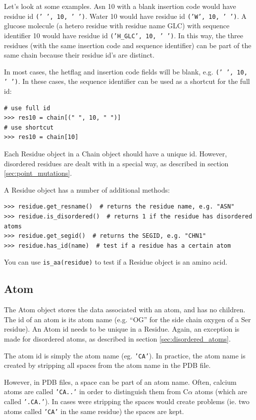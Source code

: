 Let's look at some examples. Asn 10 with a blank insertion code would have residue
id \texttt{(' ', 10, ' ')}. Water 10 would have residue id \texttt{('W', 10, ' ')}.
A glucose molecule (a hetero residue with residue name GLC) with sequence identifier
10 would have residue id \texttt{('H\_GLC', 10, ' ')}. In this way, the three
residues (with the same insertion code and sequence identifier) can be part
of the same chain because their residue id's are distinct.

In most cases, the hetflag and insertion code fields will be blank, e.g. \texttt{(' ', 10, ' ')}.
In these cases, the sequence identifier can be used as a shortcut for the full
id:

\begin{verbatim}
# use full id
>>> res10 = chain[(" ", 10, " ")]
# use shortcut
>>> res10 = chain[10]
\end{verbatim}

Each Residue object in a Chain object should have a unique id. However, disordered
residues are dealt with in a special way, as described in section \ref{sec:point_mutations}.

A Residue object has a number of additional methods:

\begin{verbatim}
>>> residue.get_resname()  # returns the residue name, e.g. "ASN"
>>> residue.is_disordered()  # returns 1 if the residue has disordered atoms
>>> residue.get_segid()  # returns the SEGID, e.g. "CHN1"
>>> residue.has_id(name)  # test if a residue has a certain atom
\end{verbatim}

You can use \texttt{is\_aa(residue)} to test if a Residue object is an amino acid.

\subsection{Atom}

The Atom object stores the data associated with an atom, and has no children.
The id of an atom is its atom name (e.g. ``OG'' for the side chain oxygen
of a Ser residue). An Atom id needs to be unique in a Residue. Again, an exception is made for disordered atoms, as described in section \ref{sec:disordered_atoms}.

The atom id is simply the atom name (eg. \texttt{'CA'}). In practice,
the atom name is created by stripping all spaces from the atom name
in the PDB file.

However, in PDB files, a space can be part of an atom name. Often,
calcium atoms are called \texttt{'CA..'} in order to distinguish them
from C$\alpha$ atoms (which are called \texttt{'.CA.'}). In cases
were stripping the spaces would create problems (ie. two atoms called
\texttt{'CA'} in the same residue) the spaces are kept.

